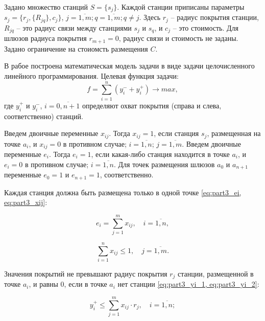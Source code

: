 Задано множество станций $S = \{s_j\}$. Каждой станции приписаны параметры $s_j = \{r_j, \{R_{jq}\}, c_j \}$, $j = \overline{1,m}; q = \overline{1,m}; q \neq j$. Здесь $r_j$ -- радиус покрытия станции, $R_{jq}$ -- это радиус связи между станциями $s_j$ и $s_q$, и $c_j$ -- это стоимость.  Для шлюзов радиуса покрытия $r_{m+1}=0$, радиус связи и стоимость не заданы. Задано ограничение на стоиомсть размещения $C$.  

В рабое построена математическая модель задачи в виде задачи целочисленного линейного программирования. Целевая функция задачи:
\begin{equation}
    \label{eq:part3_objective_function}
    f =  \sum\limits_{i=1}^n (y_i^- + y_i^+) \rightarrow max,
  \end{equation}
где $y_i^+$ и $y_i^-$, $i= \overline{0,n+1}$ определяют охват покрытия (справа и слева, соответственно) станций.


Введем двоичные переменные $x_{ij}$. Тогда $x_{ij}=1$, если станция $s_j$, размещенная на точке $a_i$, и $x_{ij}=0$ в противном случае; $i= \overline{1, n}$; $j = \overline{1,m}$. Введем двоичные переменные $ e_i $. Тогда $ e_i = 1 $, если какая-либо станция находится в точке $ a_i $, и $ e_i = 0$  в противном случае; $ i = \overline {1, n} $. Для точек размещения шлюзов $ a_0 $ и $a_{n + 1}$ переменные $ e_0 = 1 $ и $ e_{n + 1} =1 $, соответственно.




Каждая станция должна быть размещена только в одной точке \cref{eq:part3_ei, eq:part3_xij}:

\begin{equation}
    \label{eq:part3_ei}
    e_i =  \sum\limits_{j=1}^m x_{ij}, \quad i = \overline{1,n},
  \end{equation}

\begin{equation}
  \label{eq:part3_xij}
  \sum\limits_{i=1}^n x_{ij} \leq 1, \quad j = \overline{1,m}. 
\end{equation}

Значения покрытий не превышают радиус покрытия $r_j$ станции, размещенной в точке $ a_i $, и равны 0, если в точке $a_i$  нет станции \cref{eq:part3_yi_1, eq:part3_yi_2}:

\begin{equation}
  \label{eq:part3_yi_1}
  y_i^+ \leq \sum\limits_{j=1}^m x_{ij} \cdot r_j, \quad i = \overline{1,n};
\end{equation}

